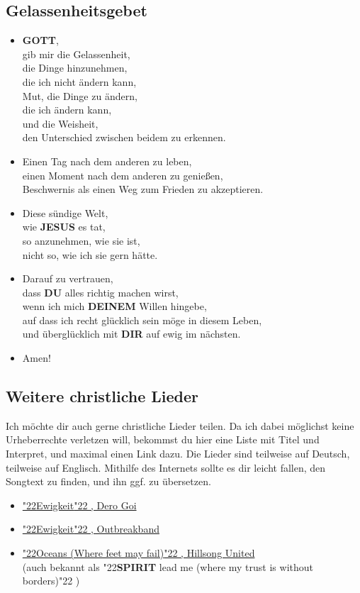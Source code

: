 \documentclass[10pt,a5paper]{article}
\newcommand{\Deinem}[0]{\textbf{DEINEM}}
\newcommand{\Dir}[0]{\textbf{DIR}}
\newcommand{\Du}[0]{\textbf{DU}}
\newcommand{\Gott}[0]{\textbf{GOTT}}
\newcommand{\Jesus}[0]{\textbf{JESUS}}
\newcommand{\Spirit}[0]{\textbf{SPIRIT}}
\newcommand{\q}[1]{\char"22{#1}\char"22 }
\begin{document}
	\subsection{Gelassenheitsgebet}
		\begin{itemize}[nosep]
			\item	{\Gott},
			\\		gib mir die Gelassenheit,
			\\		die Dinge hinzunehmen,
			\\		die ich nicht \"andern kann,
			\\		Mut,
					die Dinge zu \"andern,
			\\		die ich \"andern kann,
			\\		und die Weisheit,
			\\		den Unterschied zwischen beidem zu erkennen.
			\item	Einen Tag nach dem anderen zu leben,
			\\		einen Moment nach dem anderen zu genie{\ss}en,
			\\		Beschwernis als einen Weg zum Frieden zu akzeptieren.
			\item	Diese s\"undige Welt,
			\\		wie {\Jesus} es tat,
			\\		so anzunehmen,
					wie sie ist,
			\\		nicht so, wie ich sie gern h\"atte.
			\item	Darauf zu vertrauen,
			\\		dass {\Du} alles richtig machen wirst,
			\\		wenn ich mich {\Deinem} Willen hingebe,
			\\		auf dass ich recht gl\"ucklich sein m\"oge in diesem Leben,
			\\		und \"ubergl\"ucklich mit {\Dir} auf ewig im n\"achsten.
			\item	Amen!			
		\end{itemize}

	\subsection{Weitere christliche Lieder}
		Ich m\"ochte dir auch gerne christliche Lieder teilen.
		Da ich dabei m\"oglichst keine Urheberrechte verletzen will,
		bekommst du hier eine Liste mit Titel und Interpret,
		und maximal einen Link dazu.
		Die Lieder sind teilweise auf Deutsch,
		teilweise auf Englisch.
		Mithilfe des Internets sollte es dir leicht fallen,
		den Songtext zu finden,
		und ihn ggf. zu \"ubersetzen.
		\begin{itemize}[noitemsep]
			\item	\href{https://www.youtube.com/watch?v=Oncj9JBo1xQ}{\q{Ewigkeit},
					Dero Goi}
			\item	\href{https://www.youtube.com/watch?v=PcxaUHkmnSQ}{\q{Ewigkeit},
					Outbreakband }
			\item	\href{https://www.youtube.com/watch?v=DqlpyrHB_Qk}{\q{Oceans (Where feet may fail)},
					Hillsong United}
					\\
					(auch bekannt als \q{{\Spirit} lead me (where my trust is without borders)})
		\end{itemize}
\end{document}
